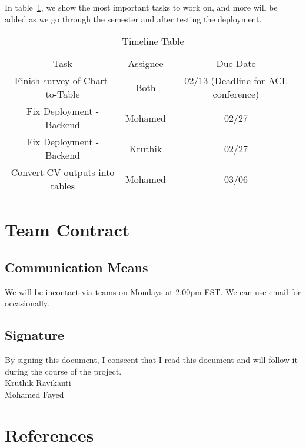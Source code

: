 \documentclass[
	letterpaper, %
]{jdf}
\begin{document}
            In table~\ref{tab:timeline}, we show the most important tasks to work on, and more will be added as we go through the semester and after testing the deployment.

            \begin{table}
                 \begin{tabular}{|c|c|c|}
                     Task & Assignee & Due Date \\
                     Finish survey of Chart-to-Table & Both & 02/13 (Deadline for ACL conference) \\
                     Fix Deployment - Backend & Mohamed  & 02/27 \\
                     Fix Deployment - Backend & Kruthik & 02/27 \\
                     Convert CV outputs into tables & Mohamed & 03/06 \\
                 \end{tabular}
                 \caption{Timeline Table}
                 \label{tab:timeline}
                  \end{table}

\section{Team Contract}\label{sect:team-contract}
\subsection{Communication Means}
We will be incontact via teams on Mondays at 2:00pm EST.
We can use email for occasionally.
\subsection{Signature}
By signing this document, I conscent that I read this document and will follow it
during the course of the project.\\
Kruthik Ravikanti \\
Mohamed Fayed

\section{References}
\printbibliography[heading=none]
\end{document}
